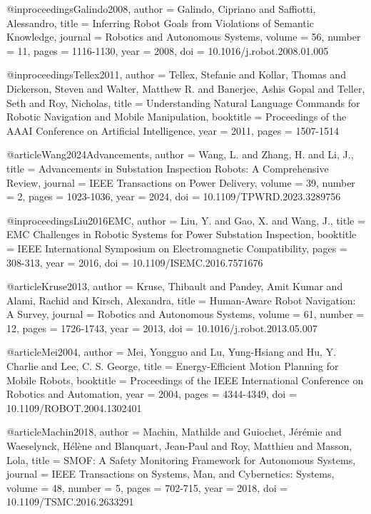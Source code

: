 @inproceedings{Galindo2008,
  author = {Galindo, Cipriano and Saffiotti, Alessandro},
  title = {Inferring Robot Goals from Violations of Semantic Knowledge},
  journal = {Robotics and Autonomous Systems},
  volume = {56},
  number = {11},
  pages = {1116-1130},
  year = {2008},
  doi = {10.1016/j.robot.2008.01.005}
}

@inproceedings{Tellex2011,
  author = {Tellex, Stefanie and Kollar, Thomas and Dickerson, Steven and Walter, Matthew R. and Banerjee, Ashis Gopal and Teller, Seth and Roy, Nicholas},
  title = {Understanding Natural Language Commands for Robotic Navigation and Mobile Manipulation},
  booktitle = {Proceedings of the AAAI Conference on Artificial Intelligence},
  year = {2011},
  pages = {1507-1514}
}

@article{Wang2024Advancements,
  author = {Wang, L. and Zhang, H. and Li, J.},
  title = {Advancements in Substation Inspection Robots: A Comprehensive Review},
  journal = {IEEE Transactions on Power Delivery},
  volume = {39},
  number = {2},
  pages = {1023-1036},
  year = {2024},
  doi = {10.1109/TPWRD.2023.3289756}
}

@inproceedings{Liu2016EMC,
  author = {Liu, Y. and Gao, X. and Wang, J.},
  title = {EMC Challenges in Robotic Systems for Power Substation Inspection},
  booktitle = {IEEE International Symposium on Electromagnetic Compatibility},
  pages = {308-313},
  year = {2016},
  doi = {10.1109/ISEMC.2016.7571676}
}

@article{Kruse2013,
  author = {Kruse, Thibault and Pandey, Amit Kumar and Alami, Rachid and Kirsch, Alexandra},
  title = {Human-Aware Robot Navigation: A Survey},
  journal = {Robotics and Autonomous Systems},
  volume = {61},
  number = {12},
  pages = {1726-1743},
  year = {2013},
  doi = {10.1016/j.robot.2013.05.007}
}

@article{Mei2004,
  author = {Mei, Yongguo and Lu, Yung-Hsiang and Hu, Y. Charlie and Lee, C. S. George},
  title = {Energy-Efficient Motion Planning for Mobile Robots},
  booktitle = {Proceedings of the IEEE International Conference on Robotics and Automation},
  year = {2004},
  pages = {4344-4349},
  doi = {10.1109/ROBOT.2004.1302401}
}

@article{Machin2018,
  author = {Machin, Mathilde and Guiochet, Jérémie and Waeselynck, Hélène and Blanquart, Jean-Paul and Roy, Matthieu and Masson, Lola},
  title = {SMOF: A Safety Monitoring Framework for Autonomous Systems},
  journal = {IEEE Transactions on Systems, Man, and Cybernetics: Systems},
  volume = {48},
  number = {5},
  pages = {702-715},
  year = {2018},
  doi = {10.1109/TSMC.2016.2633291}
}

